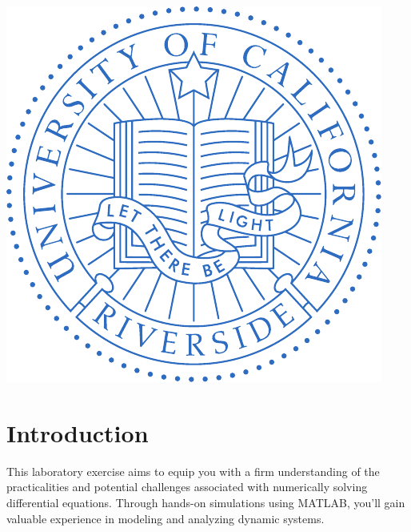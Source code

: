 \documentclass[12pt]{article}
\begin{document}
\begin{titlepage}
		\newcommand*{\plogo}{\includegraphics{Code/Fig/UC_Riverside_seal.pdf}}
		
		\plogo\\[1cm] %
		
		
		\vfill %
	\end{titlepage}
	
	\newpage
	
	\tableofcontents
	\pagebreak
	\listoffigures
	\listoftables
	\lstlistoflistings  
	\pagebreak
	
	
	\section{Introduction}
	This laboratory exercise aims to equip you with a firm understanding of the practicalities and potential challenges associated with numerically solving differential equations. Through hands-on simulations using MATLAB, you'll gain valuable experience in modeling and analyzing dynamic systems.
	
\end{document}
